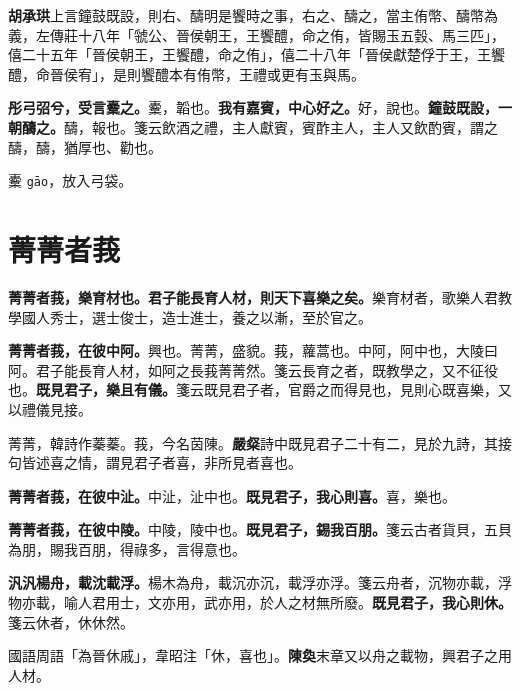 \begin{quoting}\textbf{胡承珙}上言鐘鼓既設，則右、醻明是饗時之事，右之、醻之，當主侑幣、醻幣為義，左傳莊十八年「虢公、晉侯朝王，王饗醴，命之侑，皆賜玉五瑴、馬三匹」，僖二十五年「晉侯朝王，王饗醴，命之侑」，僖二十八年「晉侯獻楚俘于王，王饗醴，命晉侯宥」，是則饗醴本有侑幣，王禮或更有玉與馬。\end{quoting}

\textbf{彤弓弨兮，受言櫜之。}{\footnotesize 櫜，韜也。}\textbf{我有嘉賓，中心好之。}{\footnotesize 好，說也。}\textbf{鐘鼓既設，一朝醻之。}{\footnotesize 醻，報也。箋云飲酒之禮，主人獻賓，賓酢主人，主人又飲酌賓，謂之醻，醻，猶厚也、勸也。}

\begin{quoting}櫜 \texttt{gāo}，放入弓袋。\end{quoting}

\section{菁菁者莪}


\textbf{菁菁者莪，樂育材也。君子能長育人材，則天下喜樂之矣。}{\footnotesize 樂育材者，歌樂人君教學國人秀士，選士俊士，造士進士，養之以漸，至於官之。}

\textbf{菁菁者莪，在彼中阿。}{\footnotesize 興也。菁菁，盛貌。莪，蘿蒿也。中阿，阿中也，大陵曰阿。君子能長育人材，如阿之長莪菁菁然。箋云長育之者，既教學之，又不征役也。}\textbf{既見君子，樂且有儀。}{\footnotesize 箋云既見君子者，官爵之而得見也，見則心既喜樂，又以禮儀見接。}

\begin{quoting}菁菁，韓詩作蓁蓁。莪，今名茵陳。\textbf{嚴粲}詩中既見君子二十有二，見於九詩，其接句皆述喜之情，謂見君子者喜，非所見者喜也。\end{quoting}

\textbf{菁菁者莪，在彼中沚。}{\footnotesize 中沚，沚中也。}\textbf{既見君子，我心則喜。}{\footnotesize 喜，樂也。}

\textbf{菁菁者莪，在彼中陵。}{\footnotesize 中陵，陵中也。}\textbf{既見君子，錫我百朋。}{\footnotesize 箋云古者貨貝，五貝為朋，賜我百朋，得祿多，言得意也。}

\textbf{汎汎楊舟，載沈載浮。}{\footnotesize 楊木為舟，載沉亦沉，載浮亦浮。箋云舟者，沉物亦載，浮物亦載，喻人君用士，文亦用，武亦用，於人之材無所廢。}\textbf{既見君子，我心則休。}{\footnotesize 箋云休者，休休然。}

\begin{quoting}國語周語「為晉休戚」，韋昭注「休，喜也」。\textbf{陳奐}末章又以舟之載物，興君子之用人材。\end{quoting}

